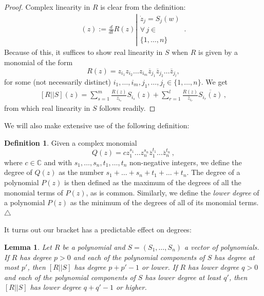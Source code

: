 \documentclass[12pt]{article}
\theoremstyle{plain}
\newtheorem{lem}[thr]{Lemma}
\theoremstyle{definition}
\newtheorem{defi}[thr]{Definition}
\theoremstyle{remark}
\theoremstyle{remark}
\begin{document}
\begin{proof}
Complex linearity in $R$ is clear from the definition:
\begin{align}
    [R||S](z) :=  \frac{d}{dt}R(z)\left|{\begin{array}{l}
  \dot{z}_j =   S_j(w) \\
   \forall \, j \in \\
   \{1, \dots, n\} 
\end{array}}\right.\, .
\end{align}
Because of this, it suffices to show real linearity in $S$ when $R$ is given by a monomial of the form
\[R(z) = z_{i_1}z_{i_2}\dots z_{i_m}\overline{z}_{j_1}\overline{z}_{j_2}\dots\overline{z}_{j_l} ,  \]
for some (not necessarily distinct) $i_1, \dots, i_m, j_1, \dots, j_l \in \{1, \dots, n\}$. We get
\begin{align}\label{needlaterrron1}
    [R||S](z) = \sum_{s=1}^m\frac{R(z)}{z_{i_s}}S_{i_s}(z) + \sum_{r=1}^l\frac{R(z)}{\overline{z}_{i_r}}\overline{S_{i_r}(z)}\, ,
\end{align}
from which real linearity in $S$ follows readily. 
\end{proof}
We will also make extensive use of the following definition:

\begin{defi}\label{lowerdegree}
Given a complex monomial 
\[Q(z) = c z_1^{s_1}\dots  z_n^{s_n} \overline{z}_1^{t_1}  \dots  \overline{z}_n^{t_n}\, ,\] 
where $c \in \mathbb{C}$ and with $s_1, \dots, s_n, t_1, \dots, t_n$ non-negative integers, we define the degree of $Q(z)$ as the number $s_1 + \dots + s_n + t_1 + \dots + t_n$. The degree of a polynomial $P(z)$ is then defined as the maximum of the degrees of all the monomial terms of $P(z)$, as is common. Similarly, we define the \emph{lower degree} of a polynomial $P(z)$ as the minimum of the degrees of all of its monomial terms. \hfill $\triangle$
\end{defi}

It turns out our bracket has a predictable effect on degrees:
\begin{lem}\label{useful0b}
Let $R$ be a polynomial and $S= (S_1, \dots, S_n)$ a vector of polynomials. 
If $R$ has degree $p>0$ and each of the polynomial components of $S$ has degree at most $p'$, then $[R||S]$ has degree $p+p'-1$ or lower. If $R$ has lower degree $q>0$ and each of the polynomial components of $S$ has lower degree at least $q'$, then $[R||S]$ has lower degree $q+q'-1$ or higher.
\end{lem}
\end{document}
